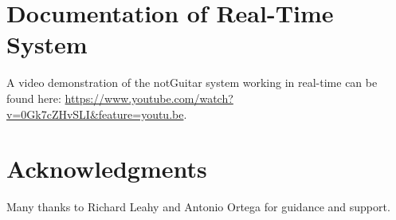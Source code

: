 \documentclass[twoside,a4paper]{article}
\begin{document}
\section{Documentation of Real-Time System}
A video demonstration of the notGuitar system working in
real-time can be found here: \url{https://www.youtube.com/watch?v=0Gk7cZHvSLI&feature=youtu.be}.

\section{Acknowledgments}
Many thanks to Richard Leahy and Antonio Ortega for guidance and support.

\nocite{*}

\end{document}
